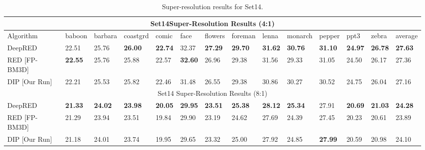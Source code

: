 \documentclass[12pt]{article}
\begin{document}
\begin{table}[htbp]
 \centering
 \footnotesize\addtolength{\tabcolsep}{-5pt}
\begin{tabularx}{\textwidth}{|l||X X X X X X X X X X X X ||l|}
 \hline
 \multicolumn{14}{|c|}{\textsf{Set14}\footnotemark Super-Resolution Results (4:1)}\\
 \hline
 Algorithm & \textsf{baboon} & \textsf{barbara} & \textsf{coastgrd} & \textsf{comic} & \textsf{face} & \textsf{flowers} & \textsf{foreman} & \textsf{lenna} & \textsf{monarch} & \textsf{pepper} & \textsf{ppt3} & \textsf{zebra} & average \\ [0.5ex]
 \hline
DeepRED & 22.51 & 25.76 & \textbf{26.00} & \textbf{22.74} & 32.37 & \textbf{27.29} & \textbf{29.70} & \textbf{31.62} & \textbf{30.76} & \textbf{31.10} & \textbf{24.97} & \textbf{26.78} & \textbf{27.63} \\
RED [FP-BM3D] & \textbf{22.55} & 25.76 & 25.88 & 22.57 & \textbf{32.60} & 26.96 & 29.38 & 31.56 & 29.33 & 31.05 & 24.50 & 26.17 & 27.36 \\
DIP [Our Run] & 22.21 & 25.53 & 25.82 & 22.46 & 31.48 & 26.55 & 29.38 & 30.86 & 30.27 & 30.52 & 24.75 & 26.04 & 27.16 \\
 \hline \hline
 \multicolumn{14}{|c|}{\textsf{Set14} Super-Resolution Results (8:1)} \\
\hline
 DeepRED & \textbf{21.33} & \textbf{24.02} & \textbf{23.98} & \textbf{20.05} & \textbf{29.95} & \textbf{23.51} & \textbf{25.38} & \textbf{28.12} & \textbf{25.34} & 27.91 & \textbf{20.69} & \textbf{21.03} & \textbf{24.28} \\
 RED [FP-BM3D] & 21.29 & 23.94 & 23.51 & 19.84 & 29.90 & 23.19 & 24.62 & 27.69 &  24.39 & 27.45 & 20.23 & 20.61 & 23.89 \\
DIP [Our Run] & 21.18 & 24.01 & 23.74 & 19.95 & 29.65 & 23.32 & 25.00 & 27.92 & 24.85 & \textbf{27.99} & 20.59 & 20.98 & 24.10 \\
 \hline
 \end{tabularx}
\caption{Super-resolution results for \textsf{Set14}.}
\label{Tab:set14}
\end{table}

\end{document}
